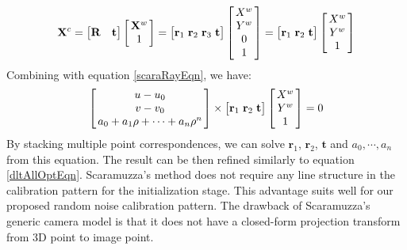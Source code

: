 \documentclass{report}
\begin{document}
\begin{equation}
\begin{split}
\mathbf{X}^c = 
\begin{bmatrix}
\mathbf{R} & \mathbf{t}
\end{bmatrix}
\arraycolsep=1.5pt%
\begin{bmatrix}
	\begin{array}{c}
	\mathbf{X}^w \\ 1
	\end{array}
\end{bmatrix}
= 
\begin{bmatrix}
\mathbf{r}_1 & \mathbf{r}_2 & \mathbf{r}_3 & \mathbf{t}
\end{bmatrix}
\arraycolsep=1.5pt%
\begin{bmatrix}
	\begin{array}{c}
	X^w \\ Y^w \\ 0 \\ 1
	\end{array}
\end{bmatrix}
= 
\begin{bmatrix}
\mathbf{r}_1 & \mathbf{r}_2 & \mathbf{t}
\end{bmatrix}
\arraycolsep=1.5pt%
\begin{bmatrix}
	\begin{array}{c}
	X^w \\ Y^w \\ 1
	\end{array}
\end{bmatrix}
\end{split}
\end{equation}
Combining with equation \ref{scaraRayEqn}, we have: 
\begin{equation}
\arraycolsep=1.5pt%
\begin{bmatrix}
	\begin{array}{c}
	u - u_0 \\ v - v_0 \\ a_0 + a_1 \rho + \cdots + a_n \rho^n
	\end{array}
\end{bmatrix} 
\times
\begin{bmatrix}
\mathbf{r}_1 & \mathbf{r}_2 & \mathbf{t}
\end{bmatrix}
\arraycolsep=1.5pt%
\begin{bmatrix}
	\begin{array}{c}
	X^w \\ Y^w \\ 1
	\end{array}
\end{bmatrix}
= 0
\end{equation}
By stacking multiple point correspondences, we can solve $\mathbf{r}_1$, $\mathbf{r}_2$, $\mathbf{t}$ and $a_0, \cdots, a_n$ from this equation. The result can be then refined similarly to equation \ref{dltAllOptEqn}. Scaramuzza's method does not require any line structure in the calibration pattern for the initialization stage. This advantage suits well for our proposed random noise calibration pattern. The drawback of Scaramuzza's generic camera model is that it does not have a closed-form projection transform from 3D point to image point. 
\end{document}
